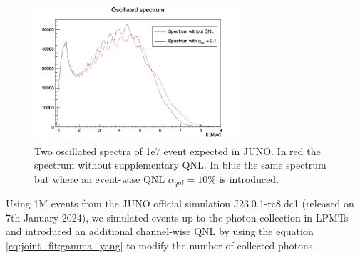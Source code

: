 \documentclass[../main.tex]{subfiles}
\begin{document}
\begin{figure}[ht]
  \centering
  \includegraphics[height=5cm]{images/joint_fit/spectrums.png}
  \caption{Two oscillated spectra of 1e7 event expected in JUNO. In red the spectrum without supplementary QNL. In blue the same spectrum but where an event-wise QNL $\alpha_{qnl} = 10\%$ is introduced.}
  \label{fig:joint_fit:spectrums_comp}
\end{figure}


Using 1M events from the JUNO official simulation J23.0.1-rc8.dc1 (released on 7th January 2024), we simulated events up to the photon collection in LPMTs and introduced an additional channel-wise QNL by using the equation \ref{eq:joint_fit:gamma_yang} to modify the number of collected photons.
\end{document}
